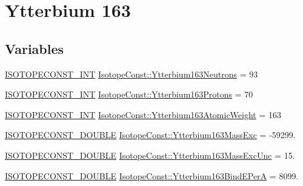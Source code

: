 \hypertarget{group___isotope_const-_ytterbium-_yb163}{}\section{Ytterbium 163}
\label{group___isotope_const-_ytterbium-_yb163}
\subsection*{Variables}
\begin{DoxyCompactItemize}
\item 
\mbox{\hyperlink{group___isotope_const-_macros_ga5f18360b3e99483a35c32d789e62621c}{I\+S\+O\+T\+O\+P\+E\+C\+O\+N\+S\+T\+\_\+\+I\+NT}} \mbox{\hyperlink{group___isotope_const-_ytterbium-_yb163_ga365351f8e2a0d6e4a2b2e25217458cf7}{Isotope\+Const\+::\+Ytterbium163\+Neutrons}} = 93
\item 
\mbox{\hyperlink{group___isotope_const-_macros_ga5f18360b3e99483a35c32d789e62621c}{I\+S\+O\+T\+O\+P\+E\+C\+O\+N\+S\+T\+\_\+\+I\+NT}} \mbox{\hyperlink{group___isotope_const-_ytterbium-_yb163_ga3c0ba38bd1cbc63396304cc8a696d3b3}{Isotope\+Const\+::\+Ytterbium163\+Protons}} = 70
\item 
\mbox{\hyperlink{group___isotope_const-_macros_ga5f18360b3e99483a35c32d789e62621c}{I\+S\+O\+T\+O\+P\+E\+C\+O\+N\+S\+T\+\_\+\+I\+NT}} \mbox{\hyperlink{group___isotope_const-_ytterbium-_yb163_ga7738711f28a15a1e18b11faabe33f245}{Isotope\+Const\+::\+Ytterbium163\+Atomic\+Weight}} = 163
\item 
\mbox{\hyperlink{group___isotope_const-_macros_ga8f45a7272ce02c0b4c65c44636ed719a}{I\+S\+O\+T\+O\+P\+E\+C\+O\+N\+S\+T\+\_\+\+D\+O\+U\+B\+LE}} \mbox{\hyperlink{group___isotope_const-_ytterbium-_yb163_ga3a727e25846b0e8b997393eca89cfadd}{Isotope\+Const\+::\+Ytterbium163\+Mass\+Exc}} = -\/59299.
\item 
\mbox{\hyperlink{group___isotope_const-_macros_ga8f45a7272ce02c0b4c65c44636ed719a}{I\+S\+O\+T\+O\+P\+E\+C\+O\+N\+S\+T\+\_\+\+D\+O\+U\+B\+LE}} \mbox{\hyperlink{group___isotope_const-_ytterbium-_yb163_gad9cafc695dd8225af4acd4a5686ed901}{Isotope\+Const\+::\+Ytterbium163\+Mass\+Exc\+Unc}} = 15.
\item 
\mbox{\hyperlink{group___isotope_const-_macros_ga8f45a7272ce02c0b4c65c44636ed719a}{I\+S\+O\+T\+O\+P\+E\+C\+O\+N\+S\+T\+\_\+\+D\+O\+U\+B\+LE}} \mbox{\hyperlink{group___isotope_const-_ytterbium-_yb163_ga8fb1c88944357a13ea9d899a9ac6424c}{Isotope\+Const\+::\+Ytterbium163\+Bind\+E\+PerA}} = 8099.
\item 

\end{DoxyCompactItemize}

